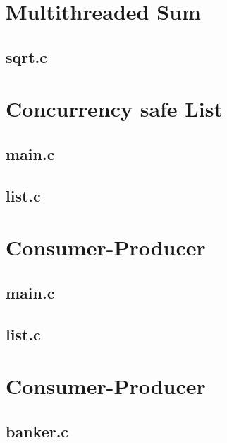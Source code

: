 \chapter{Multithreaded Sum}
\section{sqrt.c}


\chapter{Concurrency safe List}
\section{main.c}

\section{list.c}


\chapter{Consumer-Producer}
\section{main.c}

\section{list.c}


\chapter{Consumer-Producer}
\section{banker.c}

